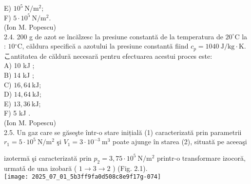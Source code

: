 E) $10^{5} \mathrm{~N} / \mathrm{m}^{2}$;\\
F) $5 \cdot 10^{5} \mathrm{~N} / \mathrm{m}^{2}$.\\
(Ion M. Popescu)\\
2.4. 200 g de azot se încălzesc la presiune constantă de la temperatura de $20^{\circ} \mathrm{C}$ la : $10{ }^{\circ} \mathrm{C}$, căldura specifică a azotului la presiune constantă fiind $c_{p}=1040 \mathrm{~J} / \mathrm{kg} \cdot \mathrm{K}$. こantitatea de căldură necesară pentru efectuarea acestui proces este:\\
A) 10 kJ ;\\
B) 14 kJ ;\\
C) $16,64 \mathrm{~kJ}$;\\
D) $14,64 \mathrm{~kJ}$;\\
E) $13,36 \mathrm{~kJ}$;\\
F) 5 kJ .\\
(Ion M. Popescu)\\
2.5. Un gaz care se găseşte într-o stare inițială (1) caracterizată prin parametrii $r_{1}=5 \cdot 10^{5} \mathrm{~N} / \mathrm{m}^{2}$ şi $V_{1}=3 \cdot 10^{-3} \mathrm{~m}^{3}$ poate ajunge în starea (2), situată pe aceeaşi

izotermă şi caracterizată prin $p_{2}=3,75 \cdot 10^{5} \mathrm{~N} / \mathrm{m}^{2}$ printr-o transformare izocoră, urmatǎ de una izobară ( $1 \rightarrow 3 \rightarrow 2$ ) (Fig. 2.1).\\
\texttt{[image: 2025\_07\_01\_5b3ff9fa0d508c8e9f17g-074]}


